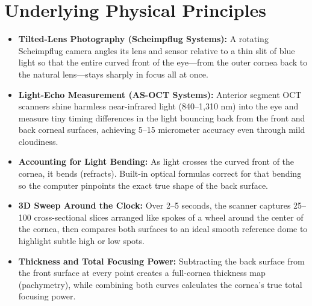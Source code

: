 \section{Underlying Physical Principles}
\begin{itemize}
    \item \textbf{Tilted-Lens Photography (Scheimpflug Systems):} A rotating Scheimpflug camera angles its lens and sensor relative to a thin slit of blue light so that the entire curved front of the eye---from the outer cornea back to the natural lens---stays sharply in focus all at once.
    \item \textbf{Light-Echo Measurement (AS-OCT Systems):} Anterior segment OCT scanners shine harmless near-infrared light (840--1,310 nm) into the eye and measure tiny timing differences in the light bouncing back from the front and back corneal surfaces, achieving 5--15 micrometer accuracy even through mild cloudiness.
    \item \textbf{Accounting for Light Bending:} As light crosses the curved front of the cornea, it bends (refracts). Built-in optical formulas correct for that bending so the computer pinpoints the exact true shape of the back surface.
    \item \textbf{3D Sweep Around the Clock:} Over 2--5 seconds, the scanner captures 25--100 cross-sectional slices arranged like spokes of a wheel around the center of the cornea, then compares both surfaces to an ideal smooth reference dome to highlight subtle high or low spots.
    \item \textbf{Thickness and Total Focusing Power:} Subtracting the back surface from the front surface at every point creates a full-cornea thickness map (pachymetry), while combining both curves calculates the cornea's true total focusing power.
\end{itemize}

